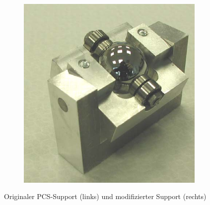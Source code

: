 \begin{figure}[htb]
\begin{subfigure}[b]{0.3\textwidth}
        \includegraphics[width=\textwidth]{./images/kugel-support_wittek.png}
    \end{subfigure}
    \caption{Originaler PCS-Support (links) und modifizierter Support (rechts) \cite{wittek_2007}}
    \label{fig:kugel_support}
\end{figure}
%

